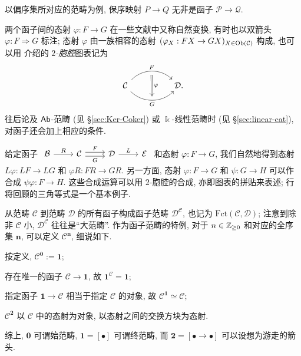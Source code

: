 以偏序集所对应的范畴为例, 保序映射 $P \to Q$ 无非是函子 $\mathcal{P} \to \mathcal{Q}$.

两个函子间的态射 $\varphi: F \to G$ 在一些文献中又称自然变换, 有时也以双箭头 $\varphi: F \Rightarrow G$ 标注; 态射 $\varphi$ 由一族相容的态射 $(\varphi_X: FX \to GX)_{X \in \operatorname{Ob}(\mathcal{C})}$ 构成, 也可以用 \cite[\S 2.2]{Li1} 介绍的 \emph{$2$-胞腔}图表记为
\[\begin{tikzcd}
	\mathcal{C} \arrow[rr, bend left=45, "F", ""'{name=F}] \arrow[rr, bend right=45, "G"', ""{name=G}] & & \mathcal{D} \arrow[Rightarrow, from=F, to=G, "\varphi"].
\end{tikzcd}\]
往后论及 $\mathsf{Ab}$-范畴 (见 \S\ref{sec:Ker-Coker}) 或 $\Bbbk$-线性范畴时 (见 \S\ref{sec:linear-cat}), 对函子还会加上相应的条件. 

给定函子
$\begin{tikzcd}
	\mathcal{B} \arrow[r, "R"] & \mathcal{C} \arrow[shift left, r, "F"] \arrow[shift right, r, "G"'] & \mathcal{D} \arrow[r, "L"] & \mathcal{E}
\end{tikzcd}$
和态射 $\varphi: F \to G$, 我们自然地得到态射 $L\varphi: LF \to LG$ 和 $\varphi R: FR \to GR$. 另一方面, 态射 $\varphi: F \to G$ 和 $\psi: G \to H$ 可以作合成 $\psi\varphi: F \to H$. 这些合成运算可以用 $2$-胞腔的合成, 亦即图表的拼贴来表述; 行将回顾的三角等式是一个基本例子.


从范畴 $\mathcal{C}$ 到范畴 $\mathcal{D}$ 的所有函子构成函子范畴 $\mathcal{D}^{\mathcal{C}}$, 也记为 $\mathrm{Fct}(\mathcal{C}, \mathcal{D})$; 注意到除非 $\mathcal{C}$ 小, $\mathcal{D}^{\mathcal{C}}$ 往往是``大范畴''. 作为函子范畴的特例, 对于 $n \in \mathbb{Z}_{\geq 0}$ 和对应的全序集 $\mathbf{n}$, 可以定义 $\mathcal{C}^{\mathbf{n}}$, 细说如下.
\begin{compactitem}
	\item 按定义, $\mathcal{C}^{\mathbf{0}} := \mathbf{1}$;
	\item 存在唯一的函子 $\mathcal{C} \to \mathbf{1}$, 故 $\mathbf{1}^{\mathcal{C}} = \mathbf{1}$;
	\item 指定函子 $\mathbf{1} \to \mathcal{C}$ 相当于指定 $\mathcal{C}$ 的对象, 故 $\mathcal{C}^{\mathbf{1}} \simeq \mathcal{C}$;
	\item $\mathcal{C}^{\mathbf{2}}$ 以 $\mathcal{C}$ 中的态射为对象, 以态射之间的交换方块为态射.
\end{compactitem}
综上, $\mathbf{0}$ 可谓始范畴, $\mathbf{1} = [\bullet]$ 可谓终范畴, 而 $\mathbf{2} = [\bullet \to \bullet]$ 可以设想为游走的箭头.

